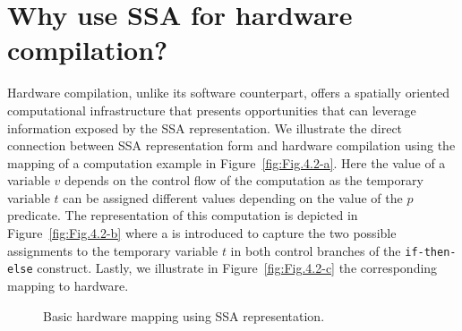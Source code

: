\section{Why use SSA for hardware compilation?}
Hardware compilation, unlike its software counterpart, offers a spatially oriented computational infrastructure that presents opportunities that can leverage information exposed by the SSA representation. 
We illustrate the direct connection between SSA representation form and hardware compilation using the mapping of a computation example in Figure~\ref{fig:Fig.4.2-a}. 
Here the value of a variable $v$ depends on the control flow of the computation as the temporary variable $t$ can be assigned different values depending on the value of the $p$ predicate. 
The representation of this computation is depicted in Figure~\ref{fig:Fig.4.2-b} where a \phifun is introduced to capture the two possible assignments to the temporary variable $t$ in both control branches of the {\tt if-then-else} construct. 
Lastly, we illustrate in Figure~\ref{fig:Fig.4.2-c} the corresponding mapping to hardware.

\begin{figure}[htbp]
  \centering
\caption{Basic hardware mapping using SSA representation.}
\label{fig:Fig.4.2}
\end{figure}

